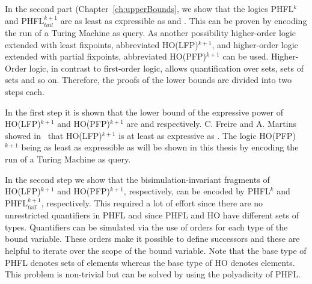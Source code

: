 In the second part (Chapter~\ref{ch:upperBounds}, we show that the logics PHFL$^k$ and PHFL$^{k+1}_{tail}$ are as least as expressible as  and . This can be proven by encoding the run of a Turing Machine as query. As another possibility higher-order logic extended with least fixpoints, abbreviated HO(LFP)$^{k+1}$, and higher-order logic extended with partial fixpoints, abbreviated HO(PFP)$^{k+1}$ can be used. Higher-Order logic, in contrast to first-order logic, allows quantification over sets, sets of sets and so on. Therefore, the proofs of the lower bounds are divided into two steps each. 

In the first step it is shown that the lower bound of the expressive power of HO(LFP)$^{k+1}$ and HO(PFP)$^{k+1}$ are  and  respectively. C. Freire and A. Martins showed in~\cite{freireMartins2011descriptive} that HO(LFP)$^{k+1}$ is at least as expressive as . The logic HO(PFP)$^{k+1}$ being as least as expressible as  will be shown in this thesis by encoding the run of a Turing Machine as query.

In the second step we show that the bisimulation-invariant fragments of HO(LFP)$^{k+1}$ and HO(PFP)$^{k+1}$, respectively, can be encoded by PHFL$^k$ and PHFL$^{k+1}_{tail}$, respectively. This required a lot of effort since there are no unrestricted quantifiers in PHFL and since PHFL and HO have different sets of types. Quantifiers can be simulated via the use of orders for each type of the bound variable. These orders make it possible to define successors and these are helpful to iterate over the scope of the bound variable. Note that the base type of PHFL denotes sets of elements whereas the base type of HO denotes elements. This problem is non-trivial but can be solved by using the polyadicity of PHFL. 

